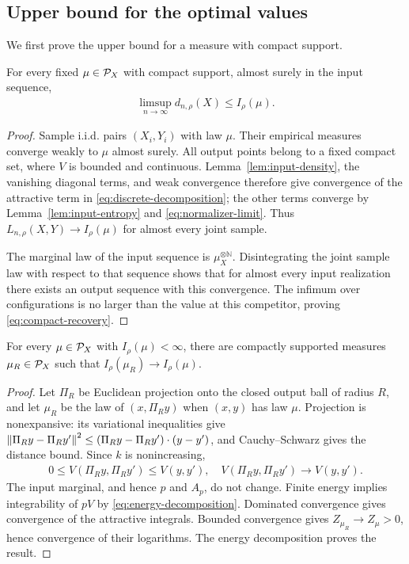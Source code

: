 \subsection{Upper bound for the optimal values}\label{tsne:sec:upper_bound}
We first prove the upper bound for a measure with compact support.
\begin{lemma}\label{lem:compact-recovery}
For every fixed $\mu\in\mathcal P_X$ with compact support, almost surely in the input sequence,
\begin{align}\label{eq:compact-recovery}
\limsup_{n\to\infty}d_{n,\rho}(X)\leq I_\rho(\mu).
\end{align}
\end{lemma}
\begin{proof}
Sample i.i.d. pairs $(X_i,Y_i)$ with law $\mu$. Their empirical measures converge weakly to $\mu$ almost surely. All output points belong to a fixed compact set, where $V$ is bounded and continuous. Lemma~\ref{lem:input-density}, the vanishing diagonal terms, and weak convergence therefore give convergence of the attractive term in \eqref{eq:discrete-decomposition}; the other terms converge by Lemma~\ref{lem:input-entropy} and \eqref{eq:normalizer-limit}. Thus $L_{n,\rho}(X,Y)\to I_\rho(\mu)$ for almost every joint sample.

The marginal law of the input sequence is $\mu_X^{\otimes\mathbb N}$. Disintegrating the joint sample law with respect to that sequence shows that for almost every input realization there exists an output sequence with this convergence. The infimum over configurations is no larger than the value at this competitor, proving \eqref{eq:compact-recovery}.
\end{proof}

\begin{lemma}\label{lem:compact-approximation}
For every $\mu\in\mathcal P_X$ with $I_\rho(\mu)<\infty$, there are compactly supported measures $\mu_R\in\mathcal P_X$ such that $I_\rho(\mu_R)\to I_\rho(\mu)$.
\end{lemma}
\begin{proof}
Let $\Pi_R$ be Euclidean projection onto the closed output ball of radius $R$, and let $\mu_R$ be the law of $(x,\Pi_Ry)$ when $(x,y)$ has law $\mu$. Projection is nonexpansive: its variational inequalities give
$\left\lVert\Pi_Ry-\Pi_Ry'\right\rVert^2\leq(\Pi_Ry-\Pi_Ry')\cdot(y-y')$, and Cauchy--Schwarz gives the distance bound. Since $k$ is nonincreasing,
\begin{align}
0\leq V(\Pi_Ry,\Pi_Ry')\leq V(y,y'),\quad
V(\Pi_Ry,\Pi_Ry')\longrightarrow V(y,y').
\end{align}
The input marginal, and hence $p$ and $A_p$, do not change. Finite energy implies integrability of $pV$ by \eqref{eq:energy-decomposition}. Dominated convergence gives convergence of the attractive integrals. Bounded convergence gives $Z_{\mu_R}\to Z_\mu>0$, hence convergence of their logarithms. The energy decomposition proves the result.
\end{proof}


